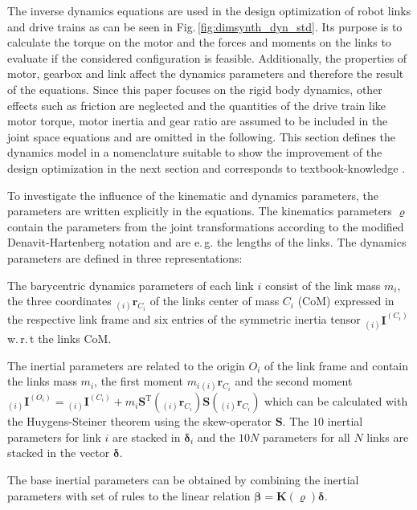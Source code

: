 \documentclass{svproc}
\newcommand{\bm}[1]{\boldsymbol{#1}}
\newcommand{\ortvek}[4]{{ }_{(#1)}{\boldsymbol{#2}}^{#3}_{#4} }
\newcommand{\transp}[0]{{\mathrm{T}}}
\begin{document}
The inverse dynamics equations are used in the design optimization of robot links and drive trains as can be seen in Fig.\,\ref{fig:dimsynth_dyn_std}.
Its purpose is to calculate the torque on the motor and the forces and moments on the links to evaluate if the considered configuration is feasible.
Additionally, the properties of motor, gearbox and link affect the dynamics parameters and therefore the result of the equations.
Since this paper focuses on the rigid body dynamics, other effects such as friction are neglected and the quantities of the drive train like motor torque, motor inertia and gear ratio are assumed to be included in the joint space equations and are omitted in the following.
This section defines the dynamics model in a nomenclature suitable to show the improvement of the design optimization in the next section and corresponds to textbook-knowledge \cite{KhalilDom2002}.

To investigate the influence of the kinematic and dynamics parameters, the parameters are written explicitly in the equations.
The kinematics parameters $\bm{\varrho}$ contain the parameters from the joint transformations according to the modified Denavit-Hartenberg notation and are e.\,g. the lengths of the links.
%
The dynamics parameters are defined in three representations:
\begin{compactitem}
\item The barycentric dynamics parameters of each link $i$ consist of the link mass $m_i$, the three coordinates $\ortvek{i}{r}{}{C_i}$ of the links center of mass $C_i$ (CoM)  expressed in the respective link frame and six entries of the symmetric inertia tensor $\ortvek{i}{I}{(C_i)}{}$ w.\,r.\,t the links CoM. 
\item The inertial parameters are related to the origin $O_i$ of the link frame and contain the links mass $m_i$, the first moment $m_i \ortvek{i}{r}{}{C_i}$ and the second moment $\ortvek{i}{I}{(O_i)}{}=\ortvek{i}{I}{(C_i)}{}+m_i\bm{S}^\transp(\ortvek{i}{r}{}{C_i})\bm{S}(\ortvek{i}{r}{}{C_i})$ which can be calculated with the Huygens-Steiner theorem using the skew-operator $\bm{S}$.
The $10$ inertial parameters for link $i$ are stacked in $\bm{\delta}_i$ and the $10N$ parameters for all $N$ links are stacked in the vector $\bm{\delta}$.
\item The base inertial parameters can be obtained by combining the inertial parameters with set of rules to the linear relation $\bm{\beta}=\bm{K}(\bm{\varrho})\bm{\delta}$.
\end{compactitem}
%
\end{document}
